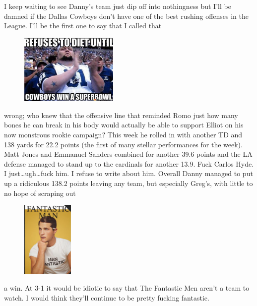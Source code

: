\documentclass[11pt,letterpaper]{article}
\begin{document}
\newpage
{}
\par\noindent I keep waiting to see Danny's team just dip off into nothingness but I'll be damned if the Dallas Cowboys don't have one of the best rushing offenses in the League. I'll be the first one to say that I called that 
\begin{figure}
\centering
\includegraphics[width=0.425\textwidth]{week4-cowboys.png}
\label{fig:week4-cowboys}
\end{figure} 
\par\noindent wrong; who knew that the offensive line that reminded Romo just how many bones he can break in his body would actually be able to support Elliot on his now monstrous rookie campaign? This week he rolled in with another TD and 138 yards for 22.2 points (the first of many stellar performances for the week). Matt Jones and Emmanuel Sanders combined for another 39.6 points and the LA defense managed to stand up to the cardinals for another 13.9. Fuck Carlos Hyde. I just\dots ugh\dots fuck him. I refuse to write about him. Overall Danny managed to put up a ridiculous 138.2 points leaving any team, but especially Greg's, with little to no hope of scraping out
\begin{figure}
\centering
\includegraphics[width=0.225\textwidth]{week4-fantastic.png}
\label{fig:week4-fantastic}
\end{figure} 
\par\noindent  a win. At 3-1 it would be idiotic to say that The Fantastic Men aren't a team to watch. I would think they'll continue to be pretty fucking fantastic. 
\end{document}

